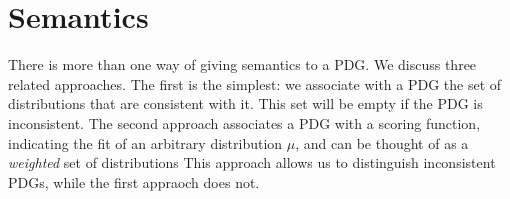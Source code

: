\documentclass{article}
\newcommand{\modelname}{probabilistic dependency graph}
\newcommand{\modelnames}{\modelname s}
\newcommand{\MN}{PDG}
\newcommand{\MNs}{\MN s}
\numberwithin{equation}{section}
\begin{document}
	\section{Semantics}\label{sec:semantics}
	There is more than one way of giving semantics to a \MN.  We discuss three related approaches.
	The first is the simplest: we associate with a PDG the set of distributions that are consistent with it. This set will be empty if the PDG is inconsistent.
	The second approach associates a PDG with a scoring function,
        indicating the fit of an arbitrary distribution $\mu$, and can
        be thought of as a \emph{weighted} set of distributions
This approach allows us to distinguish inconsistent PDGs, while the first
appraoch does not.        
\end{document}
